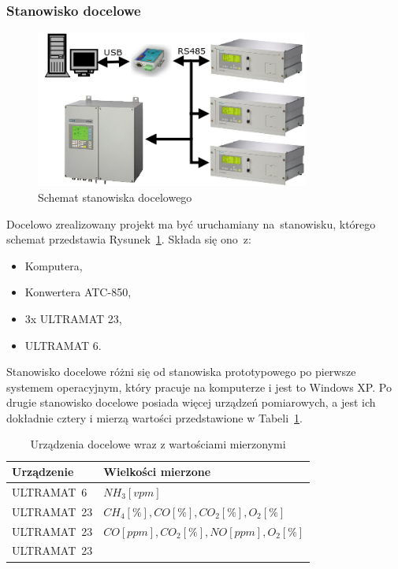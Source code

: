 \subsubsection{Stanowisko docelowe}
\begin{figure}[!htb] 	\centering 	\includegraphics[width=0.8\textwidth]{images/schemat2} 	\caption{Schemat stanowiska docelowego} \label{schemat2} \end{figure} 
Docelowo zrealizowany projekt ma być uruchamiany na~stanowisku, którego schemat przedstawia Rysunek~\ref{schemat2}. Składa się ono~z:
\begin{itemize}
\item Komputera,
\item Konwertera ATC-850,
\item 3x ULTRAMAT 23,
\item ULTRAMAT 6.
\end{itemize}
\indent
\indent Stanowisko docelowe różni się od stanowiska prototypowego po pierwsze systemem operacyjnym, który pracuje na komputerze i jest to Windows XP. Po drugie stanowisko docelowe posiada więcej urządzeń pomiarowych, a jest ich dokładnie cztery i mierzą wartości przedstawione w Tabeli~\ref{tab:docelowe}.

\begin{table}[h]
\centering
\begin{tabular}{|l|l|}
\hline Urządzenie & Wielkości mierzone \\ 
\hline ULTRAMAT~6 & $ NH_3 [vpm] $ \\ 
\hline ULTRAMAT~23 & $ CH_4 [\%], CO [\%], CO_2 [\%], O_2 [\%] $ \\ 
\hline ULTRAMAT~23 & $ CO [ppm], CO_2 [\%], NO [ppm], O_2 [\%] $ \\ 
\hline ULTRAMAT~23 & $  $ \\ 
\hline 
\end{tabular} 
\caption{Urządzenia docelowe wraz z wartościami mierzonymi}
\label{tab:docelowe}
\end{table}

